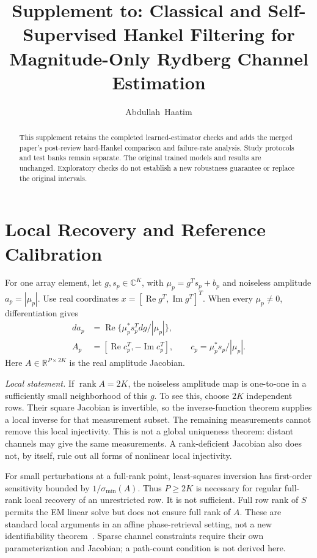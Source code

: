 \documentclass[journal]{IEEEtran}
\newcommand{\R}{\mathbb R}
\DeclareMathOperator{\rank}{rank}
\begin{document}
\title{Supplement to: Classical and Self-Supervised Hankel Filtering for Magnitude-Only Rydberg Channel Estimation}
\author{Abdullah~Haatim}
\maketitle
\begin{abstract}
This supplement retains the completed learned-estimator checks and adds
the merged paper's post-review hard-Hankel comparison and failure-rate
analysis. Study protocols and test banks remain separate. The original
trained models and results are unchanged. Exploratory checks do not
establish a new robustness guarantee or replace the original intervals.
\end{abstract}



\section{Local Recovery and Reference Calibration}
For one array element, let $g,s_p\in\mathbb C^K$, with
$\mu_p=g^Ts_p+b_p$ and noiseless amplitude $a_p=|\mu_p|$.
Use real coordinates $x=[\operatorname{Re}g^T,\operatorname{Im}g^T]^T$.
When every $\mu_p\ne0$, differentiation gives
\begin{align}
 da_p&=\operatorname{Re}\{\mu_p^*s_p^T dg/|\mu_p|\},\\
 A_p&=[\operatorname{Re}c_p^T,-\operatorname{Im}c_p^T],\qquad
 c_p=\mu_p^*s_p/|\mu_p|.
\end{align}
Here $A\in\R^{P\times2K}$ is the real amplitude Jacobian.

\textit{Local statement.} If $\rank A=2K$, the noiseless amplitude map
is one-to-one in a sufficiently small neighborhood of this $g$.
To see this, choose $2K$ independent rows. Their square Jacobian is
invertible, so the inverse-function theorem supplies a local inverse for
that measurement subset. The remaining measurements cannot remove this
local injectivity. This is not a global uniqueness theorem: distant
channels may give the same measurements. A rank-deficient Jacobian also
does not, by itself, rule out all forms of nonlinear local injectivity.

For small perturbations at a full-rank point, least-squares inversion has
first-order sensitivity bounded by $1/\sigma_{\min}(A)$.
Thus $P\ge2K$ is necessary for regular full-rank local recovery of an
unrestricted row. It is not sufficient. Full row rank of $S$ permits
the EM linear solve but does not ensure full rank of $A$. These are
standard local arguments in an affine phase-retrieval setting, not a new
identifiability theorem~\cite{gao2018}. Sparse channel constraints require their own
parameterization and Jacobian; a path-count condition is not derived here.
\end{document}
